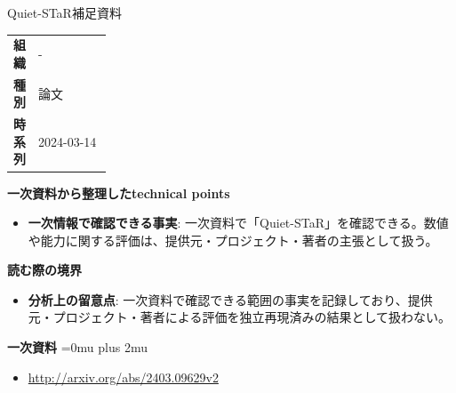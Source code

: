 \begin{technicalnote}{Quiet-STaR}{補足資料}
\begingroup
\begin{tabularx}{\linewidth}{@{}>{\bfseries}p{0.22\linewidth}X@{}}
組織 & - \\
種別 & 論文 \\
時系列 & 2024-03-14 \\
\end{tabularx}
\smallskip
{\bfseries 一次資料から整理したtechnical points}
\begin{itemize}[leftmargin=1.5em,itemsep=0.35em]
\item \textbf{一次情報で確認できる事実}: 一次資料で「Quiet-STaR」を確認できる。数値や能力に関する評価は、提供元・プロジェクト・著者の主張として扱う。
\end{itemize}
\begin{minipage}{\linewidth}
{\bfseries 読む際の境界}
\begin{itemize}[leftmargin=1.5em,itemsep=0.35em]
\item \textbf{分析上の留意点}: 一次資料で確認できる範囲の事実を記録しており、提供元・プロジェクト・著者による評価を独立再現済みの結果として扱わない。
\end{itemize}
\begin{samepage}
{\bfseries 一次資料}
\begingroup\sloppy
\Urlmuskip=0mu plus 2mu\relax
\begin{itemize}[leftmargin=1.5em,itemsep=0.25em]
\item {\scriptsize\url{http://arxiv.org/abs/2403.09629v2}}
\end{itemize}
\endgroup
\end{samepage}
\end{minipage}
\endgroup
\end{technicalnote}
\medskip

